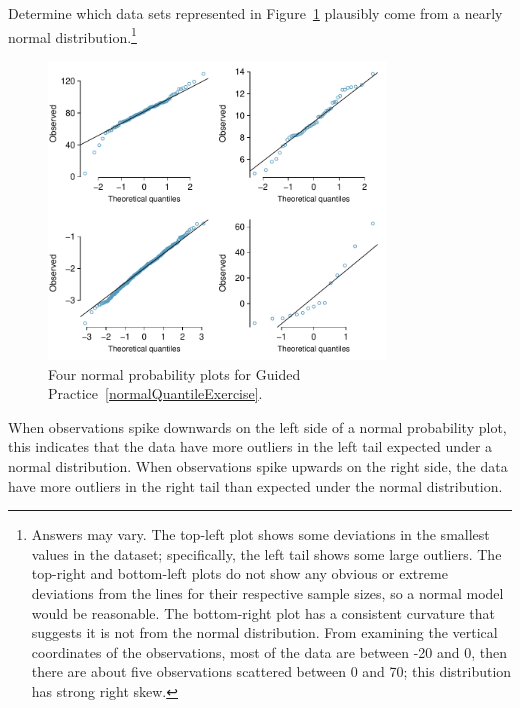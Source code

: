 \begin{exercise}\label{normalQuantileExercise}
	Determine which data sets represented in Figure~\ref{normalQuantileExer} plausibly come from a nearly normal distribution.\footnote{Answers may vary. The top-left plot shows some deviations in the smallest values in the dataset; specifically, the left tail shows some large outliers. The top-right and bottom-left plots do not show any obvious or extreme deviations from the lines for their respective sample sizes, so a normal model would be reasonable. The bottom-right plot has a consistent curvature that suggests it is not from the normal distribution. From examining the vertical coordinates of the observations, most of the data are between -20 and 0, then there are about five observations scattered between 0 and 70; this distribution has strong right skew.}
\end{exercise}

\begin{figure}[h!]
	\centering
	\includegraphics[width=0.80\textwidth]{ch_distributions_oi_biostat/figures/normalQuantileExer/normalQuantileExer}
	\caption{Four normal probability plots for Guided Practice~\ref{normalQuantileExercise}.}
	\label{normalQuantileExer}
\end{figure}



When observations spike downwards on the left side of a normal probability plot, this indicates that the data have more outliers in the left tail expected under a normal distribution. When observations spike upwards on the right side, the data have more outliers in the right tail than expected under the normal distribution.


